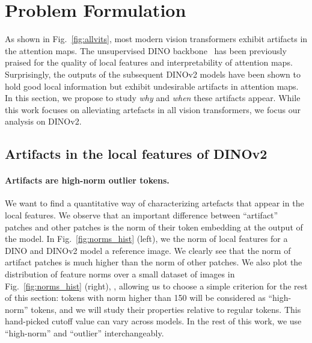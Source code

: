 \section{Problem Formulation}\label{sec:problem}
As shown in Fig.~\ref{fig:allvits}, most modern vision transformers exhibit artifacts in the attention maps.
The unsupervised DINO backbone~ has been previously praised for the quality of local features and interpretability of attention maps.
Surprisingly, the outputs of the subsequent DINOv2 models have been shown to hold good local information but exhibit undesirable artifacts in attention maps.
In this section, we propose to study \textit{why} and \textit{when} these artifacts appear.
While this work focuses on alleviating artefacts in all vision transformers, we focus our analysis on DINOv2.

\subsection{Artifacts in the local features of DINOv2}
\label{subsec:artifacts}

\paragraph{Artifacts are high-norm outlier tokens.}
We want to find a quantitative way of characterizing artefacts that appear in the local features.
We observe that an important difference between ``artifact'' patches and other patches is the norm of their token embedding at the output of the model.
In Fig.~\ref{fig:norms_hist} (left), we  the norm of local features for a DINO and DINOv2 model  a reference image.
We clearly see that the norm of artifact patches is much higher than the norm of other patches.
We also plot the distribution of feature norms over a small dataset of images in Fig.~\ref{fig:norms_hist} (right), , allowing us to choose a simple criterion for the rest of this section: tokens with norm higher than 150 will be considered as ``high-norm'' tokens, and we will study their properties relative to regular tokens. 
This hand-picked cutoff value can vary across models. 
In the rest of this work, we use ``high-norm'' and ``outlier'' interchangeably.

